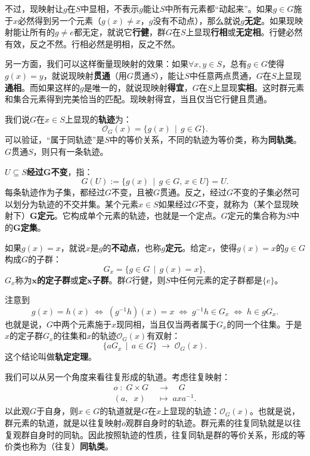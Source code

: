 \documentclass[12pt,UTF8,fontset=none]{ctexbook}
\begin{document}
不过，现映射让$g$在$S$中显相，不表示$g$能让$S$中所有元素都“动起来”。如果$g\in G$施于$x$必然得到另一个元素（$g(x)\neq x$，$g$没有不动点），那么就说$g$\textbf{无定}。如果现映射能让所有的$g\neq e$都无定，就说它\textbf{行健}，群$G$在$S$上显现\textbf{行相}或\textbf{无定相}。行健必然有效，反之不然。行相必然是明相，反之不然。

另一方面，我们可以这样衡量现映射的效果：如果$\forall x, y \in S$，总有$g\in G$使得$g(x) = y$，就说现映射\textbf{贯通}（用$G$贯通$S$），能让$S$中任意两点贯通，$G$在$S$上显现\textbf{通相}。而如果这样的$g$是唯一的，就说现映射\textbf{得宜}，$G$在$S$上显现\textbf{实相}。这时群元素和集合元素得到完美恰当的匹配。现映射得宜，当且仅当它行健且贯通。

我们说$G$在$x\in S$上显现的\textbf{轨迹}为：
$$ \mathcal{O}_G(x) = \{g(x) \, \mid \, g\in G\}.$$
可以验证，“属于同轨迹”是$S$中的等价关系，不同的轨迹为等价类，称为\textbf{同轨类}。$G$贯通$S$，则只有一条轨迹。

$U\subseteq S$\textbf{经过}$\boldsymbol{G}$\textbf{不变}，指：
$$ G(U) := \{g(x) \, \mid \, g\in G,\, x\in U\} = U. $$
每条轨迹作为子集，都经过$G$不变，且被$G$贯通。反之，经过$G$不变的子集必然可以划分为轨迹的不交并集。某个元素$x\in S$如果经过$G$不变，就称为（某个显现映射下）$\boldsymbol{G}$\textbf{定元}。它构成单个元素的轨迹，也就是一个定点。$G$定元的集合称为$S$中的$\boldsymbol{G}$\textbf{定集}。

如果$g(x) = x$，就说$x$是$g$的\textbf{不动点}，也称$g$\textbf{定元}。给定$x$，使得$g(x) = x$的$g\in G$构成$G$的子群：
$$ G_x = \{g\in G \, \mid \, g(x)= x\}, $$
$G_x$称为$\boldsymbol{x}$\textbf{的定子群}或\textbf{定}$\boldsymbol{x}$\textbf{子群}。群$G$行健，则$S$中任何元素的定子群都是$\{e\}$。

注意到
$$ g(x) = h(x) \; \Leftrightarrow \; \left(g^{-1}h\right) (x) = x \; \Leftrightarrow \; g^{-1}h \in G_x \; \Leftrightarrow \; h \in gG_x. $$
也就是说，$G$中两个元素施于$x$现同相，当且仅当两者属于$G_x$的同一个往集。于是$x$的定子群$G_x$的往集和$x$的轨迹$\mathcal{O}_G(x)$有双射：
$$ \{aG_x\,\mid\,a\in G\}\; \longrightarrow \; \mathcal{O}_G(x). $$
这个结论叫做\textbf{轨定定理}。

\begin{et}
    我们可以从另一个角度来看往复形成的轨道。考虑往复映射：
    \begin{align*}
        \mathit{o} \; : \; G \times G \; &\longrightarrow \quad G \\
        (a,\;\;x) \;&\longmapsto \; axa^{-1}.
    \end{align*}
    以此观$G$于自身，则$x\in G$的轨道就是$G$在$x$上显现的轨迹：$\mathcal{O}_G(x)$。也就是说，
    群元素的轨道，就是以往复映射$\mathit{o}$观群自身时的轨迹。群元素的往复同轨就是以往复观群自身时的同轨。因此按照轨迹的性质，往复同轨是群的等价关系，形成的等价类也称为（往复）\textbf{同轨类}。
\end{et}
\end{document}
